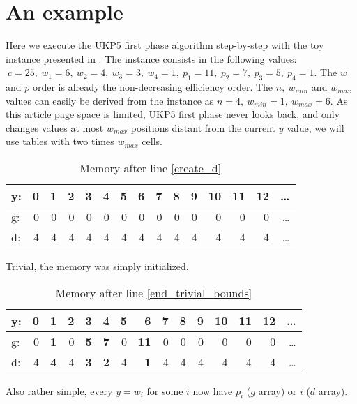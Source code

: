 \documentclass[12pt]{article}
\begin{document}
\section{An example}

Here we execute the UKP5 first phase algorithm step-by-step with the toy instance presented in \cite{garfinkel}. The instance consists in the following values: \(~c = 25,~w_1 = 6,~w_2 = 4,~w_3 = 3,~w_4 = 1,~p_1 = 11,~p_2 = 7,~p_3 = 5,~p_4 = 1\). The \(w\) and \(p\) order is already the non-decreasing efficiency order. The \(n,~w_{min}\) and \(w_{max}\) values can easily be derived from the instance as \(n = 4,~w_{min} = 1,~w_{max} = 6\). As this article page space is limited, UKP5 first phase never looks back, and only changes values at most \(w_{max}\) positions distant from the current \(y\) value, we will use tables with two times \(w_{max}\) cells.

\begin{table}[h]
\centering
\caption{Memory after line \ref{create_d}}
\label{mem_after_creation}
\begin{tabular}{l|rrrrrrrrrrrrrr}
y: & 0 &1 &2 &3 &4 &5 &6 &7 &8 &9 &10 &11 &12 &\dots\\
\hline
g: & 0 &0 &0 &0 &0 &0 &0 &0 &0 &0 &0 &0 &0 &\dots\\
d: & 4 & 4 & 4 & 4 & 4 & 4 & 4 & 4 & 4 & 4 & 4 & 4 & 4 & \dots\\
\end{tabular}
\end{table}

Trivial, the memory was simply initialized.

\begin{table}[h]
\centering
\caption{Memory after line \ref{end_trivial_bounds}}
\label{mem_after_trivial_bounds}
\begin{tabular}{l|rrrrrrrrrrrrrr}
y: & 0 &\textbf{1} &2 &\textbf{3} &\textbf{4} &5 &\textbf{6} &7 &8 &9 &10 &11 &12 &\dots\\
\hline
g: & 0 & \textbf{1} &0 &\textbf{5} &\textbf{7} &0 &\textbf{11} &0 &0 &0 &0 &0 &0 &\dots\\
d: & 4 & \textbf{4} & 4 & \textbf{3} & \textbf{2} & 4 & \textbf{1} & 4 & 4 & 4 & 4 & 4 & 4 & \dots\\
\end{tabular}
\end{table}

Also rather simple, every \(y = w_i\) for some \(i\) now have \(p_i\) (\(g\) array) or \(i\) (\(d\) array).
\end{document}
